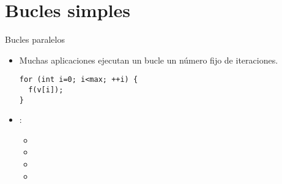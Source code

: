 \section{Bucles simples}

\begin{frame}[t,fragile]{Bucles paralelos}
\begin{itemize}
  \item Muchas aplicaciones ejecutan un bucle un número fijo de iteraciones.
\begin{lstlisting}
for (int i=0; i<max; ++i) {
  f(v[i]);
}
\end{lstlisting}

  \item {}:
    \begin{itemize}
      \item {}
      \item {}
      \item {}
      \item {}
    \end{itemize}
\end{itemize}
\end{frame}





